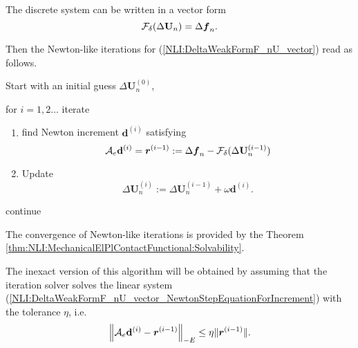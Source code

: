 \documentclass[12pt,a4paper]{scrbook}
\begin{document}
The discrete system can be written  in a vector form 
\begin{equation} \label{NLI:DeltaWeakFormF_nU_vector}
\mathcal{F}_{\delta}(\Delta \mathbf{U}_{n}) = \Delta \mbox{\boldmath$f$}_{n}.
\end{equation}

Then  the Newton-like iterations for (\ref{NLI:DeltaWeakFormF_nU_vector}) read as follows.

Start with an initial guess $\Delta \mathbf{U}^{(0)}_{n}$, 

for $i=1,2\ldots$ iterate
\begin{enumerate}
 \item find Newton increment $\mathbf{d}^{(i)}$ satisfying
\begin{equation} \label{NLI:DeltaWeakFormF_nU_vector_NewtonStepEquationForIncrement}
\mathcal{A}_{e}\mathbf{d}^{(i)} =\mbox{\boldmath$r$}^{(i-1)}:=\Delta \mbox{\boldmath$f$}_{n}-\mathcal{F}_{\delta}(\Delta \mathbf{U}^{(i-1)}_{n})
\end{equation}

\item Update 
\begin{equation}\label{NLI:DeltaWeakFormF_nU_vector_NewtonStepIncrementUpdate}
\Delta \mathbf{U}^{(i)}_{n}:=\Delta \mathbf{U}^{(i-1)}_{n}+\omega\mathbf{d}^{(i)}.
\end{equation}

\end{enumerate}
continue

\begin{remark}
The convergence of Newton-like iterations is provided by the Theorem \ref{thm:NLI:MechanicalElPlContactFunctional:Solvability}.
\end{remark}

\begin{remark}
The inexact version of this algorithm will be obtained by assuming that  the iteration solver solves the linear system  (\ref{NLI:DeltaWeakFormF_nU_vector_NewtonStepEquationForIncrement}) with the tolerance $\eta$, i.e.
\begin{equation} \label{NLI:DeltaWeakFormF_nU_vector_InexactNewtonStepEquationForIncrement}
\left\|\mathcal{A}_{e}\mathbf{d}^{(i)}-\mbox{\boldmath$r$}^{(i-1)}\right\|_{-E} \leq \eta \|\mbox{\boldmath$r$}^{(i-1)}\|.
\end{equation}
\end{remark}

\end{document}
